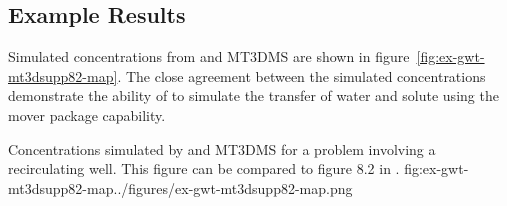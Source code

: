 

\subsection{Example Results}

Simulated concentrations from \mf and MT3DMS are shown in figure~\ref{fig:ex-gwt-mt3dsupp82-map}.  The close agreement between the simulated concentrations demonstrate the ability of \mf to simulate the transfer of water and solute using the mover package capability.

\begin{StandardFigure}{
                                     Concentrations simulated by \mf and MT3DMS for a problem involving a recirculating well.  This figure can be compared to figure 8.2 in \cite{zheng2010mt3dmsv5.3}.
                                     }{fig:ex-gwt-mt3dsupp82-map}{../figures/ex-gwt-mt3dsupp82-map.png}
\end{StandardFigure}                                 

